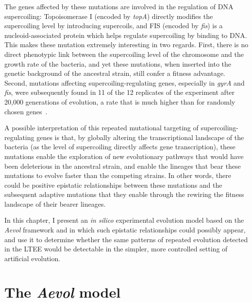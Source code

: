 The genes affected by these mutations are involved in the regulation of DNA supercoiling: Topoisomerase I (encoded by \emph{topA}) directly modifies the supercoiling level by introducing supercoils, and FIS (encoded by \emph{fis}) is a nucleoid-associated protein which helps regulate supercoiling by binding to DNA.
This makes these mutation extremely interesting in two regards.
First, there is no direct phenotypic link between the supercoiling level of the chromosome and the growth rate of the bacteria, and yet these mutations, when inserted into the genetic background of the ancestral strain, still confer a fitness advantage.
Second, mutations affecting supercoiling-regulating genes, especially in \emph{gyrA} and \emph{fis}, were subsequently found in 11 of the 12 replicates of the experiment after 20,000 generations of evolution, a rate that is much higher than for randomly chosen genes~\citep{crozat2010}.

A possible interpretation of this repeated mutational targeting of supercoiling-regulating genes is that, by globally altering the transcriptional landscape of the bacteria (as the level of supercoiling directly affects gene transcription), these mutations enable the exploration of new evolutionary pathways that would have been deleterious in the ancestral strain, and enable the lineages that bear these mutations to evolve faster than the competing strains.
In other words, there could be positive epistatic relationships between these mutations and the subsequent adaptive mutations that they enable through the rewiring the fitness landscape of their bearer lineages.

In this chapter, I present an \emph{in silico} experimental evolution model based on the \emph{Aevol} framework and in which such epistatic relationships could possibly appear, and use it to determine whether the same patterns of repeated evolution detected in the LTEE would be detectable in the simpler, more controlled setting of artificial evolution.

\section{The \emph{Aevol} model}
\label{sec:aevol:model}

